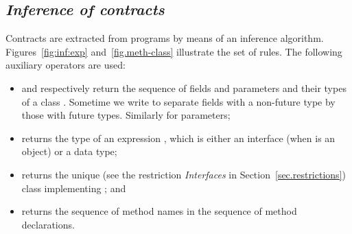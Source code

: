 

\subsection{\em Inference of contracts}

Contracts are extracted from {\coreABS} programs by means of an inference algorithm.
Figures~\ref{fig:inf:exp}
and~\ref{fig.meth-class} illustrate the set of  rules. 
The following auxiliary operators are used:
\begin{itemize}
\item  and  respectively
return the sequence of fields and parameters and their types of a class .
Sometime we write {\small} to separate fields with a non-future type by those with 
future types. Similarly for parameters;

\item  returns the type of an expression , which is either an interface (when  is an object) or a data type;
\item  returns the unique (see the restriction \emph{Interfaces} in 
Section~\ref{sec.restrictions}) class implementing ; and 
\item  returns the sequence of method names in the sequence 
 of method declarations.
\end{itemize}

